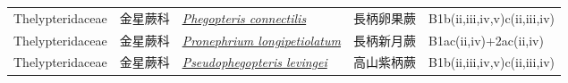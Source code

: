 {\begin{longtable}{p{2.5cm}p{2cm}p{5cm}p{2.5cm}p{3cm}}
    Thelypteridaceae & 金星蕨科 & \href{http://www.theplantlist.org/tpl1.1/search?q=Phegopteris+connectilis}{\textit{Phegopteris connectilis} } & 長柄卵果蕨 & B1b(ii,iii,iv,v)c(ii,iii,iv) \index{Phegopteris@\textit{Phegopteris}!connectilis@\textit{connectilis}}  \index{長柄卵果蕨} \\
    Thelypteridaceae & 金星蕨科 & \href{http://www.theplantlist.org/tpl1.1/search?q=Pronephrium+longipetiolatum}{\textit{Pronephrium longipetiolatum} } & 長柄新月蕨 & B1ac(ii,iv)+2ac(ii,iv) \index{Pronephrium@\textit{Pronephrium}!longipetiolatum@\textit{longipetiolatum}}  \index{長柄新月蕨} \\
    Thelypteridaceae & 金星蕨科 & \href{http://www.theplantlist.org/tpl1.1/search?q=Pseudophegopteris+levingei}{\textit{Pseudophegopteris levingei} } & 高山紫柄蕨 & B1b(ii,iii,iv,v)c(ii,iii,iv) \index{Pseudophegopteris@\textit{Pseudophegopteris}!levingei@\textit{levingei}}  \index{高山紫柄蕨} \\
    \bottomrule
        \end{longtable}
        }
    
